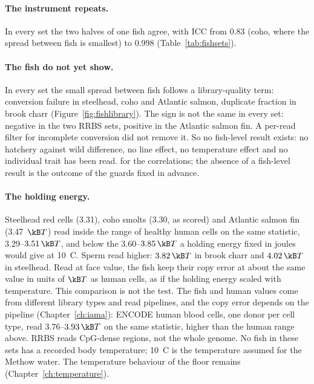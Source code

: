 \paragraph{The instrument repeats.} In every set the two halves of one fish agree, with ICC from 0.83 (coho, where the spread
between fish is smallest) to 0.998 (Table~\ref{tab:fishsets}). \measured

\paragraph{The fish do not yet show.} In every set the small spread between fish follows a library-quality term: conversion
failure in steelhead, coho and Atlantic salmon, duplicate fraction in brook charr (Figure~\ref{fig:fishlibrary}). The sign is not
the same in every set: negative in the two RRBS sets, positive in the Atlantic salmon fin. A per-read filter for incomplete conversion did not remove it. So no fish-level result exists: no hatchery
against wild difference, no line effect, no temperature effect and no individual trait has been read. \measured{} for the
correlations; the absence of a fish-level result is the outcome of the guards fixed in advance.

\paragraph{The holding energy.} Steelhead red cells (3.31), coho smolts (3.30, as scored) and Atlantic salmon fin (3.47~$\kB T$) read inside the range of healthy human cells on the same statistic,
$3.29$--$3.51\,\kB T$, and below the $3.60$--$3.85\,\kB T$ a holding energy fixed in joules would give at 10~\textdegree C.
Sperm read higher: $3.82\,\kB T$ in brook charr and $4.02\,\kB T$ in steelhead. \measured{} Read at face value, the fish keep
their copy error at about the same value in units of $\kB T$ as human cells, as if the holding energy scaled with temperature.
\interp{} This comparison is not the test. The fish and human values come from different library types and read pipelines,
and the copy error depends on the pipeline (Chapter~\ref{ch:iama}): ENCODE human blood cells, one donor per cell type, read
$3.76$--$3.93\,\kB T$ on the same statistic, higher than the human range above. RRBS reads CpG-dense regions, not the whole
genome. No fish in these sets has a recorded body temperature; 10~\textdegree C is the temperature assumed for the Methow water.
The temperature behaviour of the floor remains \openprob{} (Chapter~\ref{ch:temperature}).

